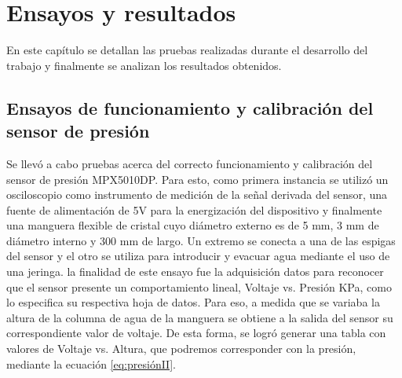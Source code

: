 
\chapter{Ensayos y resultados} %

\label{Chapter4} %

En este capítulo se detallan las pruebas realizadas durante el desarrollo del trabajo y finalmente se analizan los resultados obtenidos.
\section{Ensayos de funcionamiento y calibración del sensor de presión
}
\label{sec:Ensayos de funcionamiento y calibración del sensor de presión
}
Se llevó a cabo pruebas acerca del correcto funcionamiento y calibración del sensor de presión MPX5010DP. Para esto, como primera instancia se utilizó un osciloscopio como instrumento de medición de la señal derivada del sensor, una fuente de alimentación de 5V para la energización del dispositivo y finalmente una manguera flexible de cristal cuyo diámetro externo es de 5 mm, 3 mm de diámetro interno y 300 mm de largo. Un extremo se conecta a una de las espigas del sensor y el otro se utiliza para introducir y evacuar agua mediante el uso de una jeringa. la finalidad de este ensayo fue la adquisición datos para reconocer que el sensor presente un comportamiento lineal, Voltaje vs. Presión KPa, como lo especifica su respectiva hoja de datos. Para eso, a medida que se variaba	la altura de la columna de agua de la manguera se obtiene a la salida del sensor su correspondiente valor de voltaje. De esta forma, se logró generar una tabla con valores de Voltaje vs. Altura, que podremos corresponder con la presión, mediante la ecuación \ref{eq:presiónII}.
    
